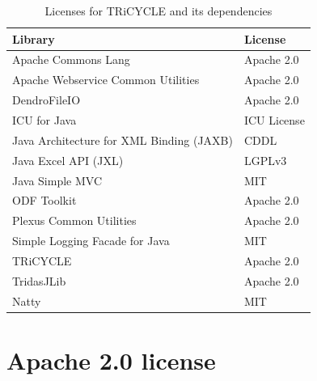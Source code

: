 \documentclass[10pt, headsepline,DIV14,BCOR0.5cm]{scrreprt}
\begin{document}
\begin{table}[htbp]
\begin{center}
\caption{Licenses for TRiCYCLE and its dependencies}
\begin{tabular*}{12cm}{ l @{\extracolsep{\fill}} l }
  \toprule
 Library & License \\
 \midrule

Apache Commons Lang & Apache 2.0 \\ 
Apache Webservice Common Utilities & Apache 2.0 \\
DendroFileIO & Apache 2.0 \\
ICU for Java & ICU License \\
Java Architecture for XML Binding (JAXB) & CDDL \\
Java Excel API (JXL) & LGPLv3 \\
Java Simple MVC & MIT \\
ODF Toolkit & Apache 2.0 \\
Plexus Common Utilities & Apache 2.0 \\
Simple Logging Facade for Java & MIT \\
TRiCYCLE & Apache 2.0 \\
TridasJLib & Apache 2.0 \\
Natty & MIT \\


\bottomrule
\end{tabular*}
\end{center}
\end{table}


\section{Apache 2.0 license}
\end{document}
